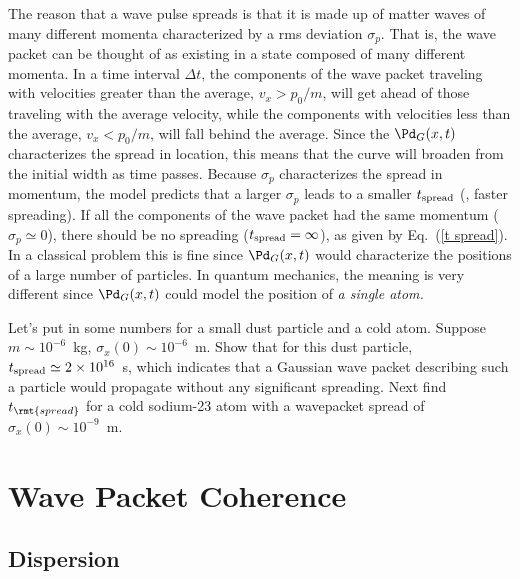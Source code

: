 The reason that a wave pulse spreads is that it is made up of matter waves of many different momenta characterized by a rms deviation $\sigma_{p}$.  That is, the wave packet can be thought of as existing in a state composed of many different momenta.  In a time interval $\Delta t$, the components of the wave packet traveling with velocities greater than the average,  $v_{x} > p_{0}/{m}$, will get ahead of those traveling with the average velocity, while the components with velocities less than the average, $v_{x} < p_{0}/{m}$, will fall behind the average.  Since the $\Pd_{G}(x,t)$ characterizes the spread in location, this means that the curve will broaden from the initial width as time passes.   Because $\sigma_{p}$ characterizes the spread in momentum, the model predicts that a larger $\sigma_{p}$ leads to a smaller $t_{\rm spread}$ (\ie, faster spreading).  If all the components of the wave packet had the same momentum  ($\sigma_{p} \simeq 0$), there should be no spreading ($t_{\rm spread} = \infty$), as given by Eq.~(\ref{t spread}).  In a classical problem this is fine since  $\Pd_{G}(x,t)$ would characterize the positions of a large number of particles.  In quantum mechanics, the meaning is very different since  $\Pd_{G}(x,t)$ could model the position of {\em a single atom.} 


 \begin{exercise}
Let's put in some numbers for a small dust particle and a cold atom.  Suppose $m \sim 10^{-6}$~kg, $\sigma_{x}(0) \sim 10^{-6}$~m.   Show that for this dust particle, $t_{\rm spread} \simeq 2 \times 10^{16}$~s, which indicates that a Gaussian wave packet describing such a particle would propagate without any significant spreading. Next find $t_\rmt{spread}$ for a cold sodium-23 atom with a wavepacket spread of $\sigma_x(0)\sim 10^{-9}$~m.
\end{exercise}

\chapter{Wave Packet Coherence}

\section{Dispersion}

